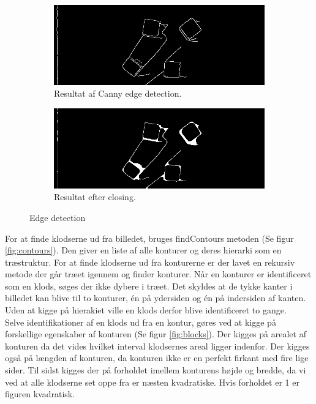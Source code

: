 \begin{figure}[H]
	\centering
	\begin{subfigure}{.45\textwidth}
		\centering
		\includegraphics[scale=0.3]{images/canny}
		\caption{Resultat af Canny edge detection.}
	  	\label{fig:canny}
	\end{subfigure}
	\begin{subfigure}{.45\textwidth}
		\centering
		\includegraphics[scale=0.3]{images/closed}
		\caption{Resultat efter closing.}
		\label{fig:close}
	\end{subfigure}
	\caption{Edge detection}
	\label{fig:edges}
\end{figure}

For at finde klodserne ud fra billedet, bruges findContours metoden (Se figur \ref{fig:contours}).
Den giver en liste af alle konturer og deres hierarki som en træstruktur.
For at finde klodserne ud fra konturerne er der lavet en rekursiv metode der går træet igennem og finder konturer.
Når en konturer er identificeret som en klods, søges der ikke dybere i træet.
Det skyldes at de tykke kanter i billedet kan blive til to konturer, én på ydersiden og én på indersiden af kanten.
Uden at kigge på hierakiet ville en klods derfor blive identificeret to gange. \\

Selve identifikationer af en klods ud fra en kontur, gøres ved at kigge på forskellige egenskaber af konturen (Se figur \ref{fig:blocks}).
Der kigges på arealet af konturen da det vides hvilket interval klodsernes areal ligger indenfor.
Der kigges også på længden af konturen, da konturen ikke er en perfekt firkant med fire lige sider.
Til sidst kigges der på forholdet imellem konturens højde og bredde, da vi ved at alle klodserne set oppe fra er næsten kvadratiske.
Hvis forholdet er 1 er figuren kvadratisk. \\


